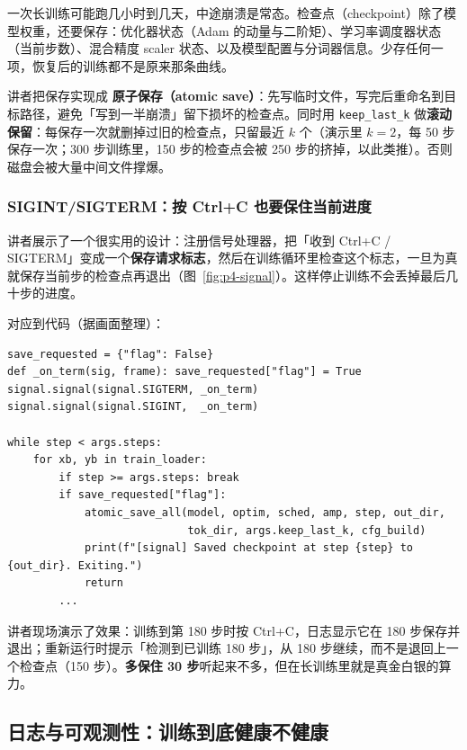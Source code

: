 一次长训练可能跑几小时到几天，中途崩溃是常态。检查点（checkpoint）除了模型权重，还要保存：优化器状态（Adam 的动量与二阶矩）、学习率调度器状态（当前步数）、混合精度 scaler 状态、以及模型配置与分词器信息。少存任何一项，恢复后的训练都不是原来那条曲线。

讲者把保存实现成 \textbf{原子保存（atomic save）}：先写临时文件，写完后重命名到目标路径，避免「写到一半崩溃」留下损坏的检查点。同时用 \texttt{keep\_last\_k} 做\textbf{滚动保留}：每保存一次就删掉过旧的检查点，只留最近 $k$ 个（演示里 $k=2$，每 50 步保存一次；300 步训练里，150 步的检查点会被 250 步的挤掉，以此类推）。否则磁盘会被大量中间文件撑爆。

\subsubsection{SIGINT/SIGTERM：按 Ctrl+C 也要保住当前进度}

讲者展示了一个很实用的设计：注册信号处理器，把「收到 Ctrl+C / SIGTERM」变成一个\textbf{保存请求标志}，然后在训练循环里检查这个标志，一旦为真就保存当前步的检查点再退出（图~\ref{fig:p4-signal}）。这样停止训练不会丢掉最后几十步的进度。

对应到代码（据画面整理）：

\begin{lstlisting}[caption={信号处理与「保存当前步」：把 Ctrl+C 变成一次保存请求，而不是直接杀掉进程。}]
save_requested = {"flag": False}
def _on_term(sig, frame): save_requested["flag"] = True
signal.signal(signal.SIGTERM, _on_term)
signal.signal(signal.SIGINT,  _on_term)

while step < args.steps:
    for xb, yb in train_loader:
        if step >= args.steps: break
        if save_requested["flag"]:
            atomic_save_all(model, optim, sched, amp, step, out_dir,
                            tok_dir, args.keep_last_k, cfg_build)
            print(f"[signal] Saved checkpoint at step {step} to {out_dir}. Exiting.")
            return
        ...
\end{lstlisting}

讲者现场演示了效果：训练到第 180 步时按 Ctrl+C，日志显示它在 180 步保存并退出；重新运行时提示「检测到已训练 180 步」，从 180 步继续，而不是退回上一个检查点（150 步）。\textbf{多保住 30 步}听起来不多，但在长训练里就是真金白银的算力。

\subsection{日志与可观测性：训练到底健康不健康}

